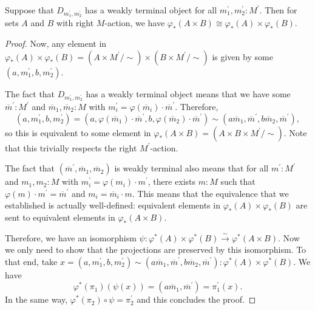 \begin{lemma}\label{lem:scalar-extension-product}
  Suppose that $ D_{m^\prime_1, m^\prime_2} $ has a weakly terminal object for all $ m^\prime_1, m^\prime_2: M^\prime $. Then for sets $ A $ and $ B $ with right $ M $-action, we have $ \varphi_*(A \times B) \cong \varphi_*(A) \times \varphi_*(B) $.
\end{lemma}
\begin{proof}
  Now, any element in $ \varphi_*(A) \times \varphi_*(B) = (A \times M^\prime / \sim) \times (B \times M^\prime / \sim) $ is given by some $ (a, m^\prime_1, b, m^\prime_2) $.

  The fact that $ D_{m^\prime_1, m^\prime_2} $ has a weakly terminal object means that we have some $ \overline m^\prime: M^\prime $ and $ \overline m_1, \overline m_2: M $ with $ m_i^\prime = \varphi(\overline m_i) \cdot \overline m^\prime $. Therefore,
  \[ (a, m^\prime_1, b, m^\prime_2) = (a, \varphi(\overline m_1) \cdot \overline m^\prime, b, \varphi(\overline m_2) \cdot \overline m^\prime) \sim (a \overline m_1, \overline m^\prime, b \overline m_2, \overline m^\prime), \]
  so this is equivalent to some element in $ \varphi_*(A \times B) = (A \times B \times M^\prime / \sim) $. Note that this trivially respects the right $ M^\prime $-action.

  The fact that $ (\overline m^\prime, \overline m_1, \overline m_2) $ is weakly terminal also means that for all $ m^\prime: M^\prime $ and $ m_1, m_2: M $ with $ m_i^\prime = \varphi(m_i) \cdot m^\prime $, there exists $ m: M $ such that $ \varphi(m) \cdot m^\prime = \overline m^\prime $ and $ m_i = \overline m_i \cdot m $. This means that the equivalence that we established is actually well-defined: equivalent elements in $ \varphi_*(A) \times \varphi_*(B) $ are sent to equivalent elements in $ \varphi_*(A \times B) $.

  Therefore, we have an isomorphism $ \psi: \varphi^*(A) \times \varphi^*(B) \xrightarrow{\sim} \varphi^*(A \times B) $. Now we only need to show that the projections are preserved by this isomorphism. To that end, take $ x = (a, m^\prime_1, b, m^\prime_2) \sim (a \overline m_1, \overline m^\prime, b \overline m_2, \overline m^\prime) : \varphi^*(A) \times \varphi^*(B) $. We have
  \[ \varphi^*(\pi_1)(\psi(x)) = (a \overline m_1, \overline m^\prime) = \pi^\prime_1(x). \]
  In the same way, $ \varphi^*(\pi_2) \circ \psi = \pi^\prime_2 $ and this concludes the proof.
\end{proof}
